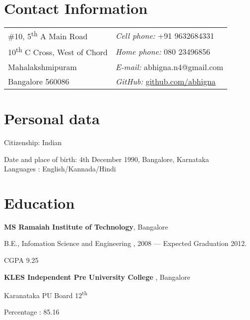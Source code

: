 \begin{resume}
\section{\sc Contact Information}
\vspace{.05in}
\begin{tabular}{@{}p{4in}p{4in}}
\#10, 5\textsuperscript{th} A Main Road    & {\it Cell phone:} +91 9632684331 \\
10\textsuperscript{th}  C Cross, West of Chord  & {\it Home phone:} 080 23496856   \\
Mahalakshmipuram & {\it E-mail:} abhigna.n4@gmail.com
\\
   Bangalore 560086 & {\it GitHub:} \href{https://github.com/abhigna}{\underline{github.com/abhigna }}
 \\
\end{tabular}

\section{\sc Personal \qquad data} Citizenship: Indian

\vspace*{-3.5mm}
Date and place of birth: 4th December 1990, Bangalore, Karnataka\\
\vspace*{-3.5mm}Languages : English/Kannada/Hindi \\

\vspace*{1.5mm}

\section{\sc Education}

{\bf \textsf{MS Ramaiah Institute of Technology}}, Bangalore\\
\vspace*{-.1in}
\begin{list1}
\item[] B.E., Infomation Science and Engineering ,  2008 ---
Expected Graduation 2012. \qquad
\begin{list2}
\item  CGPA 9.25
\end{list2}
\end{list1}

{\bf \textsf{KLES Independent Pre University College }}, Bangalore\\
\vspace*{-.1in}
\begin{list1}
\item[] Karanataka PU Board 12\textsuperscript{th}  \qquad
\begin{list2}
\item  Percentage : 85.16
\end{list2}
\end{list1}



\end{resume}
